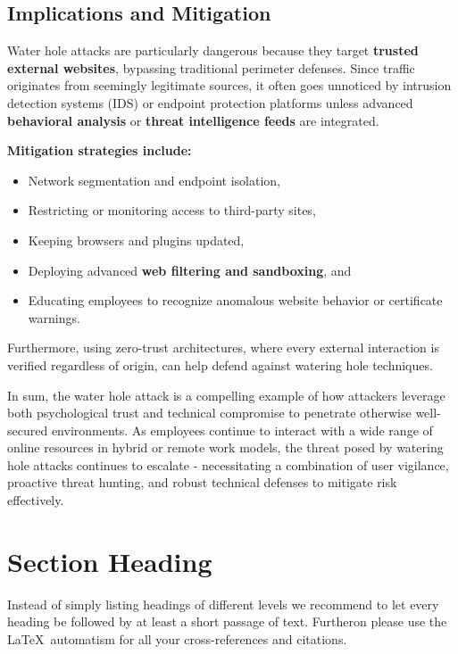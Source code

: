 {\subsection{\textbf{Implications and Mitigation}}
Water hole attacks are particularly dangerous because they target \textbf{trusted external websites}, bypassing traditional perimeter defenses. Since traffic originates from seemingly legitimate sources, it often goes unnoticed by intrusion detection systems (IDS) or endpoint protection platforms unless advanced \textbf{behavioral analysis} or \textbf{threat intelligence feeds} are integrated.

\textbf{Mitigation strategies include:}

\begin{itemize}
    \item Network segmentation and endpoint isolation,
    \item Restricting or monitoring access to third-party sites,
    \item Keeping browsers and plugins updated,
    \item Deploying advanced \textbf{web filtering and sandboxing}, and
    \item Educating employees to recognize anomalous website behavior or certificate warnings.
\end{itemize}

Furthermore, using zero-trust architectures, where every external interaction is verified regardless of origin, can help defend against watering hole techniques.

In sum, the water hole attack is a compelling example of how attackers leverage both psychological trust and technical compromise to penetrate otherwise well-secured environments. As employees continue to interact with a wide range of online resources in hybrid or remote work models, the threat posed by watering hole attacks continues to escalate - necessitating a combination of user vigilance, proactive threat hunting, and robust technical defenses to mitigate risk effectively.

\warningbox{\lipsum[4]}




\section{Section Heading}
Instead of simply listing headings of different levels we recommend to let every heading be followed by at least a short passage of text. Furtheron please use the \LaTeX\ automatism for all your cross-references and citations.


}
